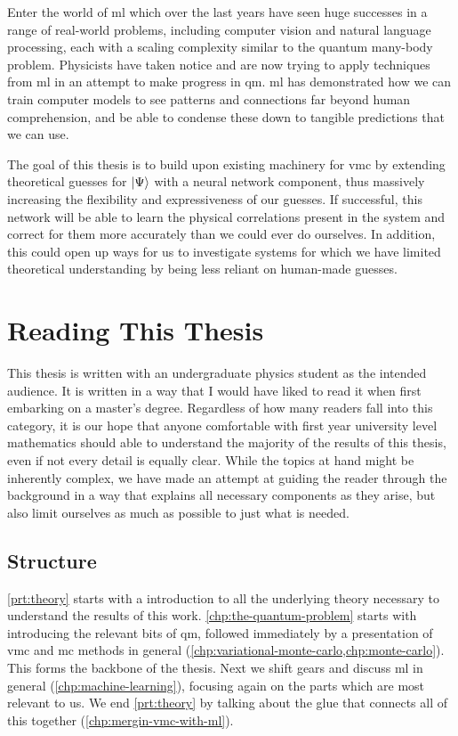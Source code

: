 \documentclass[Thesis.tex]{subfiles}
\begin{document}
Enter the world of \gls{ml} which over the last years have seen
huge successes in a range of real-world problems, including computer vision and
natural language processing, each with a scaling complexity similar to
the quantum many-body problem. Physicists have taken notice and are now trying
to apply techniques from \gls{ml} in an attempt to make progress in \gls{qm}. \Acrlong{ml} has
demonstrated how we can train computer models to see patterns and connections
far beyond human comprehension, and be able to condense these down to tangible
predictions that we can use.

The goal of this thesis is to build upon existing machinery for \gls{vmc} by extending
theoretical guesses for $| \Psi \rangle$ with a neural network component, thus massively
increasing the flexibility and expressiveness of our guesses. If successful, this
network will be able to learn the physical correlations present in the system
and correct for them more accurately than we could ever do ourselves. In
addition, this could open up ways for us to investigate systems for which we
have limited theoretical understanding by being less reliant on human-made guesses.


\section*{Reading This Thesis}

This thesis is written with an undergraduate physics student as the intended
audience. It is written in a way that I would have liked to read it when first
embarking on a master's degree. Regardless of how many readers fall into this
category, it is our hope that anyone comfortable with first year university
level mathematics should able to understand the majority of the results of this
thesis, even if not every detail is equally clear. While the topics at hand might be
inherently complex, we have made an attempt at guiding the reader through the
background in a way that explains all necessary components as they arise, but
also limit ourselves as much as possible to just what is needed.


\subsection*{Structure}
\cref{prt:theory} starts with a introduction to all the underlying theory
necessary to understand the results of this work. \cref{chp:the-quantum-problem}
starts with introducing the relevant bits of \acrlong{qm}, followed
immediately by a presentation of \acrlong{vmc} and \acrlong{mc} methods
in general (\cref{chp:variational-monte-carlo,chp:monte-carlo}). This forms the
backbone of the thesis. Next we shift gears and discuss \acrlong{ml} in
general (\cref{chp:machine-learning}), focusing again on the parts which are
most relevant to us. We end \cref{prt:theory} by talking about the glue that
connects all of this together (\cref{chp:mergin-vmc-with-ml}).
\end{document}
